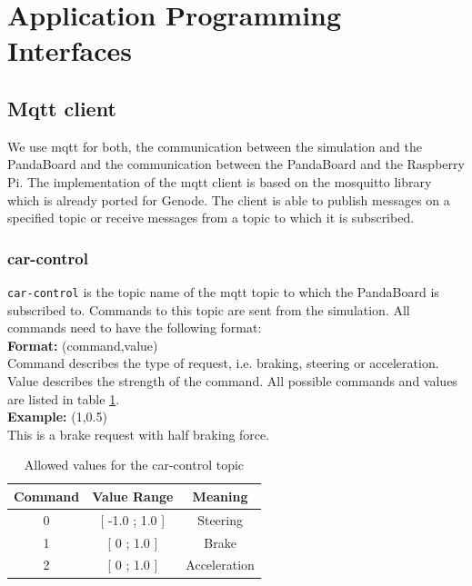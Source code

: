 \newpage
\section{Application Programming Interfaces}
\label{sec:api}

\subsection{Mqtt client}
We use mqtt for both, the communication between the simulation and the PandaBoard and the communication between the PandaBoard and the Raspberry Pi. The implementation of the mqtt client is based on the mosquitto library which is already ported for Genode. The client is able to publish messages on a specified topic or receive messages from a topic to which it is subscribed. 

\subsubsection{car-control}
\label{sec:mqtt-car-control}
\texttt{car-control} is the topic name of the mqtt topic to which the PandaBoard is subscribed to. Commands to this topic are sent from the simulation. All commands need to have the following format: \\

\textbf{Format:} (command,value) \\
Command describes the type of request, i.e. braking, steering or acceleration. Value describes the strength of the command. All possible commands and values are listed in table \ref{tab:car-control}. \\

\textbf{Example:} (1,0.5) \\
This is a brake request with half braking force. \\

\begin{table}[h]
    \centering
    \begin{tabular}{c | c | c}
        \textbf{Command} & \textbf{Value Range} & \textbf{Meaning} \\ \hline
        0   &   [ -1.0 ; 1.0 ]    & Steering \\
        1   &   [ 0 ; 1.0 ]       & Brake \\ 
        2   &   [ 0 ; 1.0 ]       & Acceleration \\ 
    \end{tabular}
    \caption{Allowed values for the car-control topic}
    \label{tab:car-control}
\end{table}


